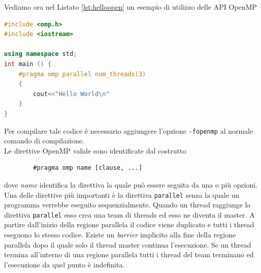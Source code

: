 Vediamo ora nel Listato \ref{lst:helloopen} un esempio di utilizzo delle API OpenMP
\begin{lstlisting}[language=C++,caption={Esempio di utilizzo delle OpenMP},label=lst:helloopen]
#include <omp.h>
#include <iostream>

using namespace std;
int main () {
	#pragma omp parallel num_threads(3)
	{
		cout<<"Hello World\n"
	}	
}
\end{lstlisting}
Per compilare tale codice è necessario aggiungere l'opzione \texttt{-fopenmp} al normale comando di compilazione.\\
Le direttive OpenMP valide sono identificate dal costrutto
\begin{verbatim}
		#pragma omp name [clause, ...]
\end{verbatim}
dove \emph{name} identifica la direttiva la quale può essere seguita da una o più opzioni. Una delle direttive più importanti è la direttiva \texttt{parallel} senza la quale un programma verrebbe eseguito sequenzialmente. Quando un thread raggiunge la direttiva \texttt{parallel} esso crea una team di  threads ed esso ne diventa il master. A partire dall'inizio della regione parallela il codice viene duplicato e tutti i thread eseguono lo stesso codice. Esiste un \emph{barrier} implicito alla fine della regione parallela dopo il quale solo il thread master continua l'esecuzione.
Se un thread termina all'interno di una regione parallela tutti i thread del team terminano ed l'esecuzione da quel punto è indefinita.